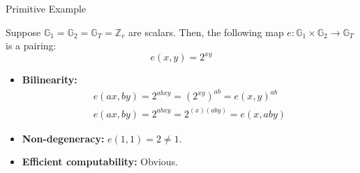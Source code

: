 \documentclass{zkdl-presentation-template}
\begin{document}
    \begin{frame}{Primitive Example}
        \begin{example}
            Suppose $\mathbb{G}_1=\mathbb{G}_2=\mathbb{G}_T=\mathbb{Z}_r$ are scalars. Then, the following map $e: \mathbb{G}_1 \times \mathbb{G}_2 \to \mathbb{G}_T$ is a pairing:
            \begin{equation*}
                e(x,y)= 2^{xy}
            \end{equation*}
            \begin{itemize}
                \item \pause\textbf{Bilinearity:}
                \begin{gather*}
                    e(ax,by) = 2^{abxy} = (2^{xy})^{ab} = e(x,y)^{ab} \\
                    e(ax,by)=2^{abxy}=2^{(x)(aby)}=e(x,aby)
                \end{gather*}
                \item \pause\textbf{Non-degeneracy:} $e(1,1)=2 \neq 1$.
                \item \pause\textbf{Efficient computability:} Obvious.
            \end{itemize}
        \end{example}
    \end{frame}
\end{document}
